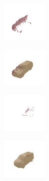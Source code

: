 \begin{figure}[t]
    \vspace*{-8px}
    \vspace*{-\figskipabove px}
    \centering
    {\scriptsize
    \begin{subfigure}[t]{0.235\textwidth}
        \begin{subfigure}[t]{0.49\textwidth}
            \vspace{0px}\centering
            \includegraphics[width=2.25cm,trim={\cropleft cm \croplower cm \cropright cm \cropupper cm},clip]{gdat_shapenet_clean_low_165_points}
        \end{subfigure}
        \begin{subfigure}[t]{0.49\textwidth}
            \vspace{0px}\centering
            \includegraphics[width=2.25cm,trim={\cropleft cm \croplower cm \cropright cm \cropupper cm},clip]{gexp_clean_high_10_wide_vae_aml_3_2_res_165}
        \end{subfigure}
        \vspace*{-2px}
    \end{subfigure}
    \begin{subfigure}[t]{0.235\textwidth}
        \begin{subfigure}[t]{0.49\textwidth}
            \vspace{0px}\centering
            \includegraphics[width=2.25cm,trim={\cropleft cm \croplower cm \cropright cm \cropupper cm},clip]{gdat_kitti_1224_points}
        \end{subfigure}
        \begin{subfigure}[t]{0.49\textwidth}
            \vspace{0px}\centering
            \includegraphics[width=2.25cm,trim={\cropleft cm \croplower cm \cropright cm \cropupper cm},clip]{gexp_cor_clean_medium_10_wide_w2_1_vae_aml_3_2_res_1224}

\end{subfigure}
\end{subfigure}}
\end{figure}
